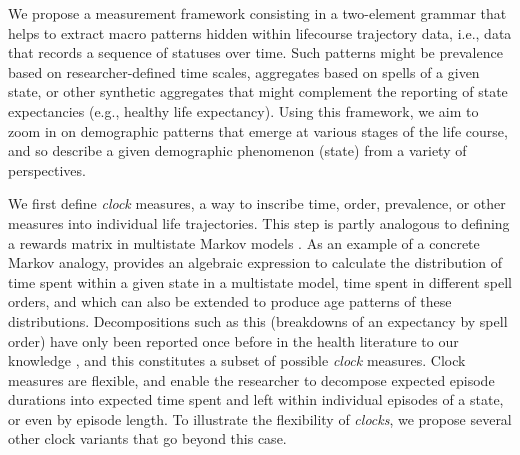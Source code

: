 \documentclass[a4paper,left=1.25cm,right=1.25cm,top=1.25cm,bottom=1.25cm]{article}
\begin{document}
% 
% 
% 
% 
We propose a measurement framework consisting in a two-element grammar that helps to extract macro patterns hidden within lifecourse trajectory data, i.e., data that records a sequence of statuses over time. Such patterns might be prevalence based on researcher-defined time scales, aggregates based on spells of a given state, or other synthetic aggregates that might complement the reporting of state expectancies (e.g., healthy life expectancy). Using this framework, we aim to zoom in on demographic patterns that emerge at various stages of the life course, and so describe a given demographic phenomenon (state) from a variety of perspectives. 

We first define \emph{clock} measures, a way to inscribe time, order, prevalence, or other measures into individual life trajectories. This step is partly analogous to defining a rewards matrix in multistate Markov models \citep[see e.g.][]{caswell2018matrix}. As an example of a concrete Markov analogy, \citet{dudel2018expanding} provides an algebraic expression to calculate the distribution of time spent within a given state in a multistate model, time spent in different spell orders, and which can also be extended to produce age patterns of these distributions. Decompositions such as this (breakdowns of an expectancy by spell order) have only been reported once before in the health literature to our knowledge \citep{laditka1998new}, and this constitutes a subset of possible \emph{clock} measures. Clock measures are flexible, and enable the researcher to decompose expected episode durations into expected time spent and left within individual episodes of a state, or even by episode length. To illustrate the flexibility of \emph{clocks}, we propose several other clock variants that go beyond this case.
\end{document}
